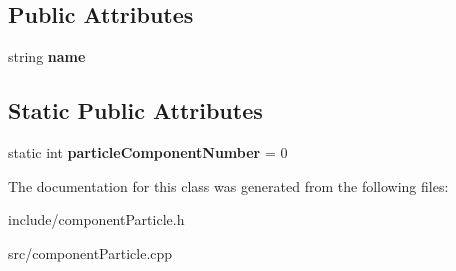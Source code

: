 \subsection*{\-Public \-Attributes}
\begin{DoxyCompactItemize}
\item 
\hypertarget{classComponentTemplateParticle_aa4fd47300750a8c03131a62f4ea5a813}{
string {\bfseries name}}
\label{d5/d74/classComponentTemplateParticle_aa4fd47300750a8c03131a62f4ea5a813}

\end{DoxyCompactItemize}
\subsection*{\-Static \-Public \-Attributes}
\begin{DoxyCompactItemize}
\item 
\hypertarget{classComponentTemplateParticle_ae7baaaa5152b92134705690192959eea}{
static int {\bfseries particle\-Component\-Number} = 0}
\label{d5/d74/classComponentTemplateParticle_ae7baaaa5152b92134705690192959eea}

\end{DoxyCompactItemize}


\-The documentation for this class was generated from the following files\-:\begin{DoxyCompactItemize}
\item 
include/component\-Particle.\-h\item 
src/component\-Particle.\-cpp\end{DoxyCompactItemize}
